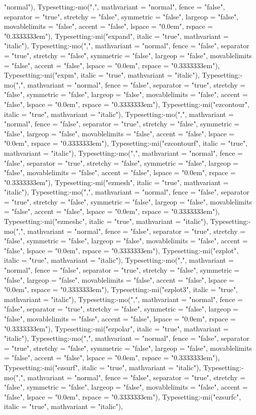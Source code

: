 \documentclass{article}
\begin{document}
{{{\begin{maplegroup}
\begin{maplelatex}
"normal"), Typesetting:-mo(",", mathvariant = "normal", fence = "false", separator = "true", stretchy = "false", symmetric = "false", largeop = "false", movablelimits = "false", accent = "false", lspace = "0.0em", rspace = "0.3333333em"), Typesetting:-mi("expand", italic = "true", mathvariant = "italic"), Typesetting:-mo(",", mathvariant = "normal", fence = "false", separator = "true", stretchy = "false", symmetric = "false", largeop = "false", movablelimits = "false", accent = "false", lspace = "0.0em", rspace = "0.3333333em"), Typesetting:-mi("expm", italic = "true", mathvariant = "italic"), Typesetting:-mo(",", mathvariant = "normal", fence = "false", separator = "true", stretchy = "false", symmetric = "false", largeop = "false", movablelimits = "false", accent = "false", lspace = "0.0em", rspace = "0.3333333em"), Typesetting:-mi("ezcontour", italic = "true", mathvariant = "italic"), Typesetting:-mo(",", mathvariant = "normal", fence = "false", separator = "true", stretchy = "false", symmetric = "false", largeop = "false", movablelimits = "false", accent = "false", lspace = "0.0em", rspace = "0.3333333em"), Typesetting:-mi("ezcontourf", italic = "true", mathvariant = "italic"), Typesetting:-mo(",", mathvariant = "normal", fence = "false", separator = "true", stretchy = "false", symmetric = "false", largeop = "false", movablelimits = "false", accent = "false", lspace = "0.0em", rspace = "0.3333333em"), Typesetting:-mi("ezmesh", italic = "true", mathvariant = "italic"), Typesetting:-mo(",", mathvariant = "normal", fence = "false", separator = "true", stretchy = "false", symmetric = "false", largeop = "false", movablelimits = "false", accent = "false", lspace = "0.0em", rspace = "0.3333333em"), Typesetting:-mi("ezmeshc", italic = "true", mathvariant = "italic"), Typesetting:-mo(",", mathvariant = "normal", fence = "false", separator = "true", stretchy = "false", symmetric = "false", largeop = "false", movablelimits = "false", accent = "false", lspace = "0.0em", rspace = "0.3333333em"), Typesetting:-mi("ezplot", italic = "true", mathvariant = "italic"), Typesetting:-mo(",", mathvariant = "normal", fence = "false", separator = "true", stretchy = "false", symmetric = "false", largeop = "false", movablelimits = "false", accent = "false", lspace = "0.0em", rspace = "0.3333333em"), Typesetting:-mi("ezplot3", italic = "true", mathvariant = "italic"), Typesetting:-mo(",", mathvariant = "normal", fence = "false", separator = "true", stretchy = "false", symmetric = "false", largeop = "false", movablelimits = "false", accent = "false", lspace = "0.0em", rspace = "0.3333333em"), Typesetting:-mi("ezpolar", italic = "true", mathvariant = "italic"), Typesetting:-mo(",", mathvariant = "normal", fence = "false", separator = "true", stretchy = "false", symmetric = "false", largeop = "false", movablelimits = "false", accent = "false", lspace = "0.0em", rspace = "0.3333333em"), Typesetting:-mi("ezsurf", italic = "true", mathvariant = "italic"), Typesetting:-mo(",", mathvariant = "normal", fence = "false", separator = "true", stretchy = "false", symmetric = "false", largeop = "false", movablelimits = "false", accent = "false", lspace = "0.0em", rspace = "0.3333333em"), Typesetting:-mi("ezsurfc", italic = "true", mathvariant = "italic"), 
\end{maplelatex}
\end{maplegroup}}}}
\end{document}
